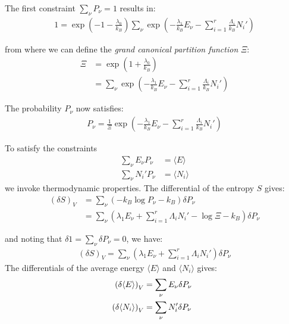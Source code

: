\documentclass[book.tex]{subfiles}
\begin{document}
The first constraint $\sum_\nu P_\nu = 1 $ results in:
\begin{align}
1 = \exp \left(-1-\frac{\lambda_0}{k_B}\right) \sum_\nu  \exp\left(-\frac{\lambda_1}{k_B}E_\nu - \sum_{i=1}^r \frac{\Lambda_i}{k_B} N_i'\right) 
\end{align}

\noindent from where we can define the \textit{grand canonical partition function} $\Xi$:
\begin{align}\label{PartGrand}
\Xi &= \exp \left(1+\frac{\lambda_0}{k_B}\right) \\
&= \sum_\nu  \exp\left(-\frac{\lambda_1}{k_B}E_\nu - \sum_{i=1}^r \frac{\Lambda_i}{k_B} N_i'\right)
\end{align}

The probability $P_\nu$ now satisfies:
\begin{align}\label{ProbGrand}
P_\nu = \frac{1}{\Xi}\exp\left(-\frac{\lambda_1}{k_B}E_\nu - \sum_{i=1}^r \frac{\Lambda_i}{k_B} N_i'\right)
\end{align}

To satisfy the constraints
\begin{align}
\sum_\nu E_\nu P_\nu &= \langle E\rangle \\ \sum_\nu N_i' P_\nu &= \langle N_i \rangle
\end{align}
\noindent we invoke thermodynamic properties. The differential of the entropy $S$ gives:
\begin{align}
\left(\delta S\right)_{V} &= \sum_\nu \left( - k_B \log P_\nu - k_B\right)\delta P_\nu \\ &= \sum_\nu \left(\lambda_1 E_\nu + \sum_{i=1}^r\Lambda_iN_i' - \log \Xi - k_B\right)\delta P_\nu 
\end{align}

\noindent and noting that $\delta 1 = \sum_\nu \delta P_\nu = 0$, we have:
\begin{align}
\left(\delta S\right)_{V}  = \sum_\nu \left( \lambda_1 E_\nu  + \sum_{i=1}^r\Lambda_iN_i'\right) \delta P_\nu 
\end{align}
The differentials of the average energy $\langle E \rangle$ and $\langle N_i \rangle$ gives: 
\begin{align}
\left(\delta \langle E \rangle \right)_{V} &= \sum_\nu E_\nu \delta P_\nu \hspace{0.2cm} \\
\left(\delta \langle N_i \rangle \right)_{V} &= \sum_\nu N_i' \delta P_\nu 
\end{align}
\end{document}
